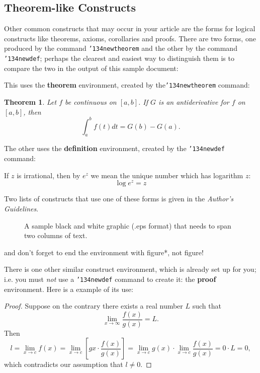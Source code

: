 \documentclass{acm_proc_article-sp}
\begin{document}
\subsection{Theorem-like Constructs}
Other common constructs that may occur in your article are
the forms for logical constructs like theorems, axioms,
corollaries and proofs.  There are
two forms, one produced by the
command \texttt{{\char'134}newtheorem} and the
other by the command \texttt{{\char'134}newdef}; perhaps
the clearest and easiest way to distinguish them is
to compare the two in the output of this sample document:

This uses the \textbf{theorem} environment, created by
the\linebreak\texttt{{\char'134}newtheorem} command:
\newtheorem{theorem}{Theorem}
\begin{theorem}
Let $f$ be continuous on $[a,b]$.  If $G$ is
an antiderivative for $f$ on $[a,b]$, then
\begin{displaymath}\int^b_af(t)dt = G(b) - G(a).\end{displaymath}
\end{theorem}

The other uses the \textbf{definition} environment, created
by the \texttt{{\char'134}newdef} command:
\begin{definition}
If $z$ is irrational, then by $e^z$ we mean the
unique number which has
logarithm $z$: \begin{displaymath}{\log e^z = z}\end{displaymath}
\end{definition}

Two lists of constructs that use one of these
forms is given in the
\textit{Author's  Guidelines}.

\begin{figure*}
\centering
\caption{A sample black and white graphic (.eps format)
that needs to span two columns of text.}
\end{figure*}
and don't forget to end the environment with
{figure*}, not {figure}!
 
There is one other similar construct environment, which is
already set up
for you; i.e. you must \textit{not} use
a \texttt{{\char'134}newdef} command to
create it: the \textbf{proof} environment.  Here
is a example of its use:
\begin{proof}
Suppose on the contrary there exists a real number $L$ such that
\begin{displaymath}
\lim_{x\rightarrow\infty} \frac{f(x)}{g(x)} = L.
\end{displaymath}
Then
\begin{displaymath}
l=\lim_{x\rightarrow c} f(x)
= \lim_{x\rightarrow c}
\left[ g{x} \cdot \frac{f(x)}{g(x)} \right ]
= \lim_{x\rightarrow c} g(x) \cdot \lim_{x\rightarrow c}
\frac{f(x)}{g(x)} = 0\cdot L = 0,
\end{displaymath}
which contradicts our assumption that $l\neq 0$.
\end{proof}
\end{document}
